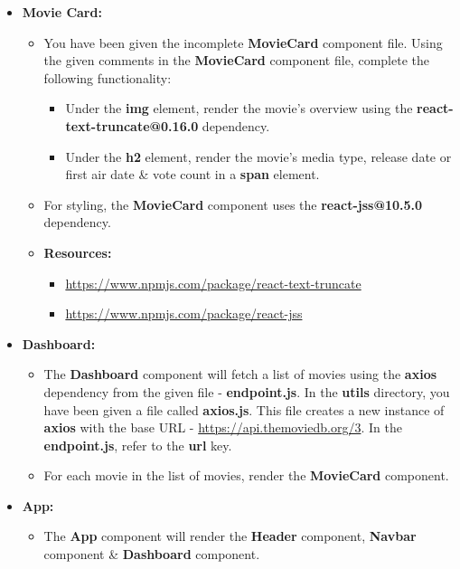 \documentclass{article}
\begin{document}
\begin{itemize}
\begin{itemize}
	\end{itemize}
	\item \textbf{Movie Card:}
	\begin{itemize}
		\item You have been given the incomplete \textbf{MovieCard} component file. Using the given comments in the \textbf{MovieCard} component file, complete the following functionality:
		\begin{itemize}
			\item Under the \textbf{img} element, render the movie's overview using the \textbf{react-text-truncate@0.16.0} dependency. 
			\item Under the \textbf{h2} element, render the movie's media type, release date or first air date \& vote count in a \textbf{span} element. 
		\end{itemize}
		\item For styling, the \textbf{MovieCard} component uses the \textbf{react-jss@10.5.0} dependency.
		\item \textbf{Resources:}
		\begin{itemize}
			\item \href{https://www.npmjs.com/package/react-text-truncate}{https://www.npmjs.com/package/react-text-truncate}
			\item \href{https://www.npmjs.com/package/react-jss}{https://www.npmjs.com/package/react-jss}
		\end{itemize}
	\end{itemize}
	\item \textbf{Dashboard:}
	\begin{itemize}
		\item The \textbf{Dashboard} component will fetch a list of movies using the \textbf{axios} dependency from the given file - \textbf{endpoint.js}. In the \textbf{utils} directory, you have been given a file called \textbf{axios.js}. This file creates a new instance of \textbf{axios} with the base URL - \href{https://api.themoviedb.org/3}{https://api.themoviedb.org/3}. In the \textbf{endpoint.js}, refer to the \textbf{url} key.
		\item For each movie in the list of movies, render the \textbf{MovieCard} component.
	\end{itemize}
	\item \textbf{App:}
	\begin{itemize}
		\item The \textbf{App} component will render the \textbf{Header} component, \textbf{Navbar} component \& \textbf{Dashboard} component.
	\end{itemize}
\end{itemize}
\end{document}
